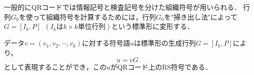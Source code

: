 \documentclass{thesis}
\begin{document}
一般的にQRコードでは情報記号と検査記号を分けた組織符号が用いられる．
行列$G_0$を使って組織符号を計算するためには，行列$G_0$を"掃き出し法"によって$G=[I_k,P]$\
$(I_kはk\times k単位行列)$という標準形に変形する．

データ$v=(v_1,v_2,\cdots,v_k)$に対する符号語$u$は標準形の生成行列$G=[I_k,P]$により，
\begin{equation}
 u=vG
\end{equation}
として表現することができ，この$u$がQRコード上のRS符号である．













\end{document}
